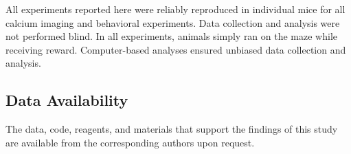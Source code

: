 All experiments reported here were reliably reproduced in individual mice for all calcium imaging and behavioral experiments. Data collection and analysis were not performed blind. In all experiments, animals simply ran on the maze while receiving reward. Computer-based analyses ensured unbiased data collection and analysis.

\subsection{Data Availability}

The data, code, reagents, and materials that support the findings of this study are available from the corresponding authors upon request.
